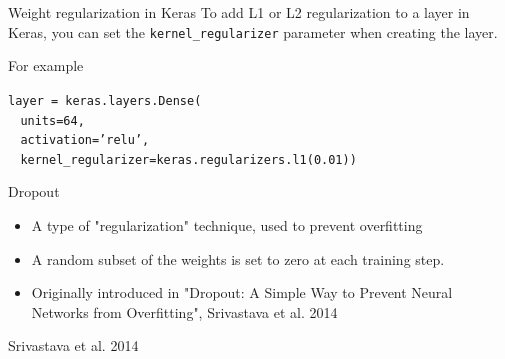 \documentclass[9pt, aspectratio=169]{beamer}
\begin{document}
\begin{frame}
    {Weight regularization in Keras}
    To add L1 or L2 regularization to a layer in Keras, you can set the \texttt{kernel\_regularizer} parameter when creating the layer.

    For example

    \begin{codebox}
        \texttt{layer = keras.layers.Dense(\\
            $~~~~$units=64,\\
            $~~~~$activation='relu',\\
            $~~~~$kernel\_regularizer=keras.regularizers.l1(0.01))
        }
    \end{codebox}
\end{frame}

\begin{frame}
    {Dropout}
    \begin{itemize}
        \item A type of "regularization" technique, used to prevent overfitting
        \item A random subset of the weights is set to zero at each training step.
        \item Originally introduced in "Dropout: A Simple Way to Prevent Neural Networks from Overfitting", Srivastava et al. 2014
    \end{itemize}

    \centering

    \footnotesize
    \raggedright
    Srivastava et al. 2014
\end{frame}
\end{document}
